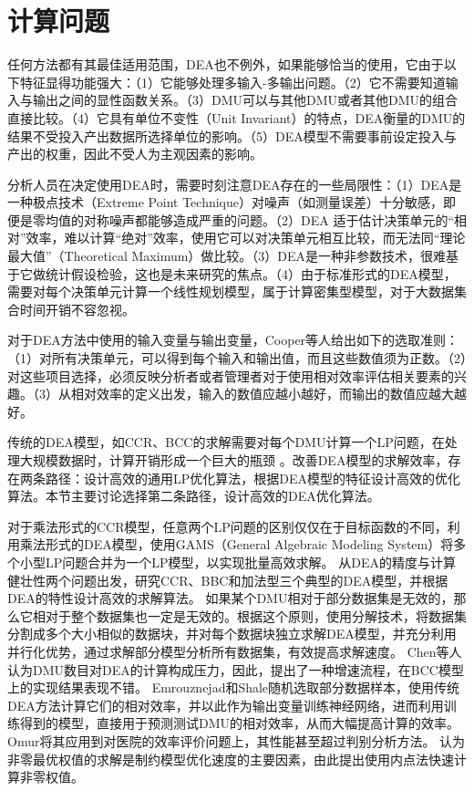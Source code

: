 \section{计算问题}
任何方法都有其最佳适用范围，DEA也不例外，如果能够恰当的使用，它由于以下特征显得功能强大：（1）它能够处理多输入-多输出问题。（2）它不需要知道输入与输出之间的显性函数关系。（3）DMU可以与其他DMU或者其他DMU的组合直接比较。（4）它具有单位不变性（Unit Invariant）的特点，DEA衡量的DMU的结果不受投入产出数据所选择单位的影响。（5）DEA模型不需要事前设定投入与产出的权重，因此不受人为主观因素的影响。

分析人员在决定使用DEA时，需要时刻注意DEA存在的一些局限性：（1）DEA是一种极点技术（Extreme Point Technique）对噪声（如测量误差）十分敏感，即便是零均值的对称噪声都能够造成严重的问题。（2）DEA 适于估计决策单元的“相对”效率，难以计算“绝对”效率，使用它可以对决策单元相互比较，而无法同“理论最大值”（Theoretical Maximum）做比较。（3）DEA是一种非参数技术，很难基于它做统计假设检验，这也是未来研究的焦点。（4）由于标准形式的DEA模型，需要对每个决策单元计算一个线性规划模型，属于计算密集型模型，对于大数据集合时间开销不容忽视。

对于DEA方法中使用的输入变量与输出变量，Cooper等人给出如下的选取准则\cite{cooper2000dea}：（1）对所有决策单元，可以得到每个输入和输出值，而且这些数值须为正数。（2）对这些项目选择，必须反映分析者或者管理者对于使用相对效率评估相关要素的兴趣。（3）从相对效率的定义出发，输入的数值应越小越好，而输出的数值应越大越好。

传统的DEA模型，如CCR、BCC的求解需要对每个DMU计算一个LP问题，在处理大规模数据时，计算开销形成一个巨大的瓶颈
\cite{dula2008computational,dula2011algorithm}。改善DEA模型的求解效率，存在两条路径：设计高效的通用LP优化算法，根据DEA模型的特征设计高效的优化算法。本节主要讨论选择第二条路径，设计高效的DEA优化算法。

对于乘法形式的CCR模型，任意两个LP问题的区别仅仅在于目标函数的不同，\cite{kalvelagen2002efficiently}利用乘法形式的DEA模型，使用GAMS（General Algebraic Modeling System）将多个小型LP问题合并为一个LP模型，以实现批量高效求解。
\cite{ali1990data,ali1993streamlined}从DEA的精度与计算健壮性两个问题出发，研究CCR、BBC和加法型三个典型的DEA模型，并根据DEA的特性设计高效的求解算法。
如果某个DMU相对于部分数据集是无效的，那么它相对于整个数据集也一定是无效的。根据这个原则，\cite{barr1997parallel}使用分解技术，将数据集分割成多个大小相似的数据块，并对每个数据块独立求解DEA模型，并充分利用并行化优势，通过求解部分模型分析所有数据集，有效提高求解速度。
Chen等人\cite{chen2009procedure}认为DMU数目对DEA的计算构成压力，因此，提出了一种增速流程，在BCC模型上的实现结果表现不错。
Emrouznejad和Shale\cite{emrouznejad2009combined}随机选取部分数据样本，使用传统DEA方法计算它们的相对效率，并以此作为输出变量训练神经网络，进而利用训练得到的模型，直接用于预测测试DMU的相对效率，从而大幅提高计算的效率。
Omur\cite{tosun2012using}将其应用到对医院的效率评价问题上，其性能甚至超过判别分析方法。
\cite{bougnol2012interior}认为非零最优权值的求解是制约模型优化速度的主要因素，由此提出使用内点法快速计算非零权值。

